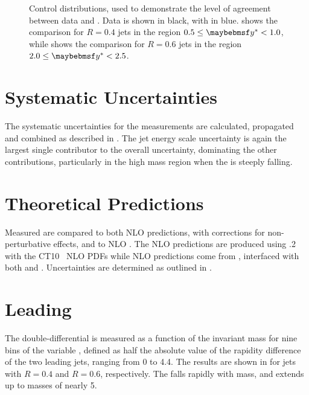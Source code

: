 \begin{figure}[htpb]
{    \label{fig:dijets:control_akt6_2_25}}
  \caption{Control distributions, used to demonstrate the level of agreement between data and \MC. Data is shown in black, with \Pythia in blue. \protect{} shows the comparison for \akt $R=0.4$ jets in the region $0.5 \leq \yStar < 1.0$, while \protect{} shows the comparison for \akt $R=0.6$ jets in the region $2.0 \leq \yStar < 2.5$.}
  \label{fig:dijets:data_mc_control_distributions}
\end{figure}

\section{Systematic Uncertainties}
The systematic uncertainties for the \dijet \xs measurements are calculated,
propagated and combined as described in .
The jet energy scale uncertainty is again the largest single contributor to the
overall uncertainty, dominating the other contributions, particularly in the
high mass region when the \xs is steeply falling.

\section{Theoretical Predictions}
Measured \dijet {} are compared to both NLO \pQCD predictions,
with corrections for non-perturbative effects, and to NLO \MC. The NLO
\pQCD predictions are produced using .2~\cite{Nagy:2003:NLOjet}
with the CT10~\cite{Lai:2010:LHAPDF_CT10} NLO PDFs while NLO \MC predictions
come from \Powheg, interfaced with both \Pythia and \Herwig. Uncertainties are
determined as outlined in .

\section{Leading \Dijet {}}
The \dijet double-differential \xs is measured as a function of the \dijet
invariant mass for nine bins of the variable \yStar, defined as
half the absolute value of the rapidity difference of the two leading jets, ranging
from 0 to 4.4. The results are shown in  for \akt jets with $R=0.4$
and $R=0.6$, respectively. The \xs falls rapidly with mass, and extends up to \dijet
masses of nearly \unit{5}{\TeV}.

